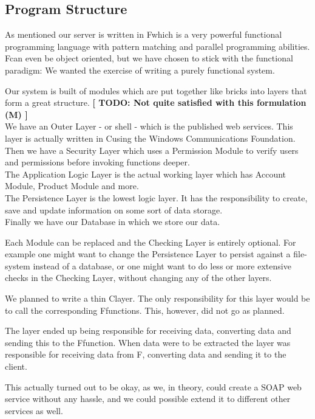 \subsection{Program Structure}
As mentioned our server is written in F\Sh which is a very powerful functional programming language with pattern matching and parallel programming abilities.
F\Sh can even be object oriented, but we have chosen to stick with the functional paradigm: We wanted the exercise of writing a purely functional system.

Our system is built of modules which are put together like bricks into layers that form a great structure. \textbf{[ TODO: Not quite satisfied with this formulation (M) ]}
\\We have an Outer Layer - or shell - which is the published web services. This layer is actually written in C\Sh using the Windows Communications Foundation.
\\Then we have a Security Layer which uses a Permission Module to verify users and permissions before invoking functions deeper.
\\The Application Logic Layer is the actual working layer which has Account Module, Product Module and more.
\\The Persistence Layer is the lowest logic layer. It has the responsibility to create, save and update information on some sort of data storage.
\\Finally we have our Database in which we store our data.

Each Module can be replaced and the Checking Layer is entirely optional. For example one might want to change the Persistence Layer to persist against a file-system instead of a database, or one might want to do less or more extensive checks in the Checking Layer, without changing any of the other layers.

We planned to write a thin C\Sh layer. The only responsibility for this layer would be to call the corresponding F\Sh functions. This, however, did not go as planned.

The layer ended up being responsible for receiving data, converting data and sending this to the F\Sh function. When data were to be extracted the layer was responsible for receiving data from F\Sh, converting data and sending it to the client.

This actually turned out to be okay, as we, in theory, could create a SOAP web service without any hassle, and we could possible extend it to different other services as well.


